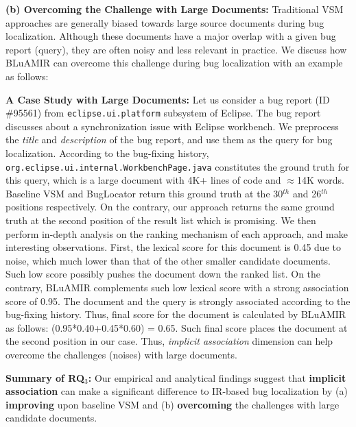 \documentclass[conference]{IEEEtran}
\begin{document}

\textbf{(b) Overcoming the Challenge with Large Documents:}
Traditional VSM approaches are generally biased towards large source documents during bug localization. Although these documents have a major overlap with a given bug report (query), they are often noisy and less relevant in practice. We discuss how BLuAMIR can overcome this challenge during bug localization with an example as follows:

\textbf{A Case Study with Large Documents:} Let us consider a bug report (ID \#95561) from \texttt{eclipse.ui.platform} subsystem of Eclipse. The bug report discusses about a synchronization issue with Eclipse workbench. We preprocess the \emph{title} and \emph{description} of the bug report, and use them as the query for bug localization. According to the bug-fixing history, \texttt{org.eclipse.ui.internal.WorkbenchPage.java} constitutes the ground truth for this query, which is a large document with 4K+ lines of code and $\approx$14K words. Baseline VSM \cite{vector-space-model} and BugLocator \cite{Jian} return this ground truth at the 30$^{th}$ and 26$^{th}$ positions respectively. On the contrary, our approach returns the same ground truth at the second position of the result list which is promising. We then perform in-depth analysis on the ranking mechanism of each approach, and make interesting observations. First, the lexical score for this document is 0.45 due to noise, which much lower than that of the other smaller candidate documents. Such low score possibly pushes the document down the ranked list. On the contrary, BLuAMIR complements such low lexical score with a strong association score of 0.95. The document and the query is strongly associated according to the bug-fixing history. Thus, final score for the document is calculated by BLuAMIR as follows:  (0.95*0.40+0.45*0.60) = 0.65. Such final score places the document at the second position in our case. Thus, \emph{implicit association} dimension can help overcome the challenges (noises) with large documents. 

\begin{framed}
	\noindent
	\textbf{Summary of RQ$_3$:} Our empirical and analytical findings suggest that \textbf{implicit association} can make a significant difference to IR-based bug localization by (a) \textbf{improving} upon baseline VSM and (b) \textbf{overcoming} the challenges with large candidate documents.    
\end{framed}
\end{document}
